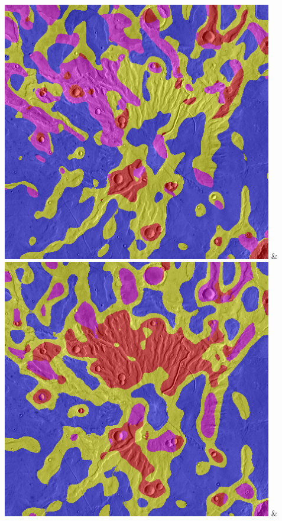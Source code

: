 \begin{table}[h!]
\begin{tabularx}{\textwidth}
		\includegraphics[width=.9\linewidth]{images/gen/filterbanks/Gre13_03.jpg_LM.png} &
		\includegraphics[width=.9\linewidth]{images/gen/filterbanks/Gre13_03.jpg_S.png} &

\end{tabularx}
\end{table}

